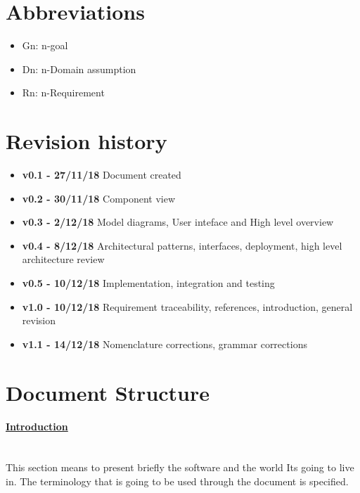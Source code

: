 \section{Abbreviations}
\begin{itemize}
\item Gn: n-goal
\item Dn: n-Domain assumption
\item Rn: n-Requirement
\end{itemize}

\section{Revision history}
\begin{itemize}
\item \textbf{v0.1 - 27/11/18} Document created
\item \textbf{v0.2 - 30/11/18} Component view
\item \textbf{v0.3 - 2/12/18} Model diagrams, User inteface and High level overview
\item \textbf{v0.4 - 8/12/18} Architectural patterns, interfaces, deployment, high level architecture review
\item \textbf{v0.5 - 10/12/18} Implementation, integration and testing 
\item \textbf{v1.0 - 10/12/18} Requirement traceability, references, introduction, general revision
\item \textbf{v1.1 - 14/12/18} Nomenclature corrections, grammar corrections
\end{itemize}
\section{Document Structure}
\paragraph{\hyperref[sect:introduction]{Introduction}} \mbox{}\\
This section means to present briefly the software and the world It\textquotesingle s going to live in. The terminology that is going to be used through the document is specified.
